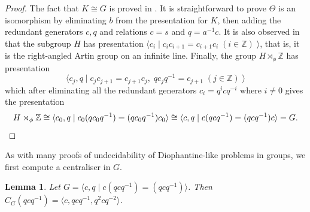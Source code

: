 \documentclass[11pt]{amsart}
\newtheorem{lem}[theorem]{Lemma}
\theoremstyle{definition}
\numberwithin{theorem}{section}
\newcommand{\Z}{\mathbb{Z}}
\begin{document}
\begin{proof} The fact that $K \cong G$ is proved in \cite[Section~2]{Burns1987}. It is straightforward to prove $\Theta$ is an isomorphism by eliminating $b$ from the presentation for $K$, then adding the redundant generators $c,q$ and relations $c=s$ and $q= a^{-1}c$. It is also observed in \cite[Section~2]{Burns1987} that the subgroup $H$ has presentation $\langle c_i \mid c_i c_{i+1} = c_{i+1} c_i  \; (i \in \Z) \; \rangle$, that is, it is the right-angled Artin group on an infinite line. Finally, the group $H \rtimes_\phi \Z$ has presentation 
\[
\langle c_j, q \mid 
c_j c_{j+1} = c_{j+1} c_j, \; 
q c_j q^{-1} = c_{j+1} \; (j \in \Z) \; \rangle  
\]
which after eliminating all the redundant generators $c_i = q^i c q^{-i}$ where $i \neq 0$ gives the presentation \[
H \rtimes_\phi \Z \cong \langle c_0, q \mid c_0 (qc_0 q^{-1}) = (qc_0 q^{-1}) c_0 \rangle \cong  
\langle c, q \mid c (qc q^{-1}) = (qc q^{-1}) c \rangle = G. \qedhere
\]  
\end{proof}

As with many proofs of undecidability of Diophantine-like problems in groups, we
first compute a centraliser in \(G\).

\begin{lem}
		\label{Bob-gp-centraliser}
Let \(G = \langle c, q \mid c (qcq^{-1}) = (qcq^{-1})  \rangle\). Then
\(C_G(qcq^{-1}) = \langle c, qcq^{-1}, q^2 c q^{-2} \rangle\).
\end{lem}
\end{document}
